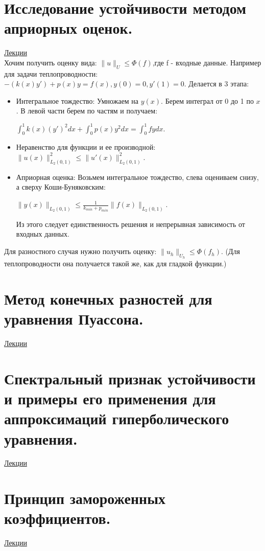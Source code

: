 \documentclass[specialist, subf, href, colorlinks=true, 12pt, times, mtpro, final]{disser}
\theoremstyle{definition}
\begin{document}
{\section {Исследование устойчивости методом априорных оценок.}
    \hyperlink {lects.125}{Лекции}\\
    Хочим получить оценку вида: $\| u\|_{U} \leq \Phi(f)$,где f - входные данные. Например для задачи теплопроводности: $-(k(x)y') + p(x)y = f(x), y(0) = 0, y'(1) = 0$. Делается в 3 этапа:
    \begin{itemize}
    	\item Интегральное тождество: Умножаем на $y(x)$. Берем интеграл от 0 до 1 по $x$. В левой части берем по частям и получаем:
    	\begin{center} $\int^1_0k(x)(y')^2dx + \int^1_0p(x)y^2dx = \int^1_0fydx$. \end{center}
    	\item Неравенство для функции и ее производной: $\| u(x)\|^2_{L_2(0,1)} \leq \| u'(x)\|^2_{L_2(0,1)}$.
    	\item Априорная оценка: Возьмем интегральное тождество, слева оцениваем снизу, а сверху Коши-Буняковским: 
    	\begin{center} $\| y(x)\|_{L_2(0,1)} \leq \frac{1}{k_{min}+p_{min}}\| f(x)\|_{L_2(0,1)}$. \end{center}
    	Из этого следует единственность решения и непрерывная зависимость от входных данных.
    \end{itemize}
    Для разностного случая нужно получить оценку: $\| u_h\|_{U_h} \leq \Phi(f_h)$. (Для теплопроводности она получается такой же, как для гладкой функции.)

\section {Метод конечных разностей для уравнения Пуассона.}
    \hyperlink {lects.128}{Лекции}\\

\section {Спектральный признак устойчивости и примеры его применения для аппроксимаций гиперболического уравнения.}
    \hyperlink {lects.130}{Лекции}\\

\section {Принцип замороженных коэффициентов.}
    \hyperlink {lects.132}{Лекции}\\

}
\end{document}

